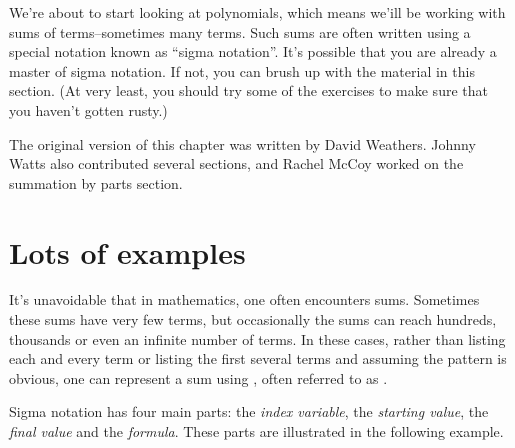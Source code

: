 


We're about to start looking at polynomials, which means we'ill be working with sums of terms--sometimes many terms. Such sums are often written using a special notation known as ``sigma notation''.  It's possible that you are already a master of sigma notation. If not, you can brush up with the material in this section. (At very least, you should try some of the exercises to make sure that you haven't gotten rusty.)
\bigskip

The original version of this chapter was written by David Weathers. Johnny Watts also contributed several sections, and Rachel McCoy worked on the summation by parts section.

\section{Lots of examples}

It's unavoidable that in mathematics, one often encounters sums.  Sometimes these sums have very few terms, but occasionally the sums can reach hundreds, thousands or even an infinite number of terms.  In these cases, rather than listing each and every term or listing the first several terms and assuming the pattern is obvious, one can represent a sum using , often referred to as . 

 Sigma notation has four main parts:  the \emph{index variable}, the \emph{starting value}, the \emph{final value} and the \emph{formula}.
These parts are illustrated in the following example.

